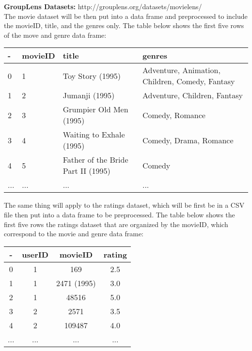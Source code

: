 \documentclass{article}
\begin{document}
\textbf{GroupLens Datasets:} http://grouplens.org/datasets/movielens/\\
 
The movie dataset will be then put into a data frame and preprocessed to include the movieID, title, and the genres only. The table below shows the 
first five rows of the move and genre data frame:
\begin{center}
\begin{tabular}{| m{1cm} | m{1.5cm}| m{3cm} | m{5em} |}
    \hline
    - & movieID & title & genres \\ [0.5ex] 
    \hline\hline
    0 & 1 & Toy Story (1995) & Adventure, Animation, Children, Comedy, Fantasy \\ 
    \hline
    1 & 2 & Jumanji (1995) & Adventure, Children, Fantasy \\
    \hline
    2 & 3 & Grumpier Old Men (1995) & Comedy, Romance \\
    \hline
    3 & 4 & Waiting to Exhale (1995) & Comedy, Drama, Romance \\
    \hline
    4 & 5 & Father of the Bride Part II (1995) & Comedy \\
    \hline
    ... & ... & ... & ... \\ [1ex]
    \hline
\end{tabular}
\end{center}

The same thing will apply to the ratings dataset, which will be first be in a CSV file then put into a data frame to be preprocessed. The table below shows the first 
five rows the ratings dataset that are organized by the movieID, which correspond to the movie and genre data frame:
\begin{center}
\begin{tabular}{||c c c c||}
        \hline
    - & userID & movieID & rating \\ [0.5ex] 
    \hline\hline
    0 & 1 & 169 & 2.5 \\ 
    \hline
    1 & 1 & 2471 (1995) & 3.0 \\
    \hline
    2 & 1 & 48516 & 5.0 \\
    \hline
    3 & 2 & 2571 & 3.5 \\
    \hline
    4 & 2 & 109487 & 4.0 \\
    \hline
    ... & ... & ... & ... \\ [1ex] 
    \hline
\end{tabular}
\end{center}
\end{document}
